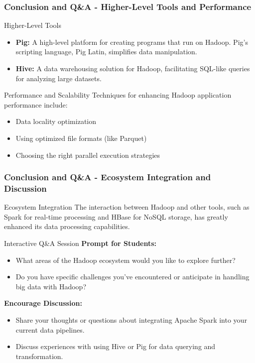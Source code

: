\documentclass[aspectratio=169]{beamer}
\begin{document}
\begin{frame}[fragile]
    \frametitle{Conclusion and Q\&A - Higher-Level Tools and Performance}
    \begin{block}{Higher-Level Tools}
        \begin{itemize}
            \item \textbf{Pig:} A high-level platform for creating programs that run on Hadoop. Pig's scripting language, Pig Latin, simplifies data manipulation.
            \item \textbf{Hive:} A data warehousing solution for Hadoop, facilitating SQL-like queries for analyzing large datasets.
        \end{itemize}
    \end{block}

    \begin{block}{Performance and Scalability}
        Techniques for enhancing Hadoop application performance include:
        \begin{itemize}
            \item Data locality optimization
            \item Using optimized file formats (like Parquet)
            \item Choosing the right parallel execution strategies
        \end{itemize}
    \end{block}
\end{frame}

\begin{frame}[fragile]
    \frametitle{Conclusion and Q\&A - Ecosystem Integration and Discussion}
    \begin{block}{Ecosystem Integration}
        The interaction between Hadoop and other tools, such as Spark for real-time processing and HBase for NoSQL storage, has greatly enhanced its data processing capabilities.
    \end{block}

    \begin{block}{Interactive Q\&A Session}
        \textbf{Prompt for Students:}
        \begin{itemize}
            \item What areas of the Hadoop ecosystem would you like to explore further?
            \item Do you have specific challenges you've encountered or anticipate in handling big data with Hadoop?
        \end{itemize}

        \textbf{Encourage Discussion:}
        \begin{itemize}
            \item Share your thoughts or questions about integrating Apache Spark into your current data pipelines.
            \item Discuss experiences with using Hive or Pig for data querying and transformation.
        \end{itemize}
    \end{block}
\end{frame}
\end{document}
